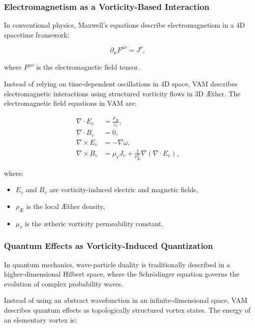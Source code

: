 \documentclass[a4paper,10pt]{article}
\begin{document}
    \subsubsection*{Electromagnetism as a Vorticity-Based Interaction}

    In conventional physics, Maxwell's equations describe electromagnetism in a 4D spacetime framework:

    \begin{equation*}
        \partial_\mu F^{\mu\nu} = J^\nu,
    \end{equation*}

    where \( F^{\mu\nu} \) is the electromagnetic field tensor.

    Instead of relying on time-dependent oscillations in 4D space, VAM describes electromagnetic interactions using structured vorticity flows in 3D Æther. The electromagnetic field equations in VAM are:

    \begin{align}
        \nabla \cdot E_v &= \frac{\rho_\text{Æ}}{\varepsilon_v}, \\
        \nabla \cdot B_v &= 0, \\
        \nabla \times E_v &= -\nabla \omega, \\
        \nabla \times B_v &= \mu_v J_v + \frac{1}{\nu^2_\text{Æ}} \nabla(\nabla \cdot E_v),
    \end{align}

    where:
    \begin{itemize}
        \item \( E_v \) and \( B_v \) are vorticity-induced electric and magnetic fields,
        \item \( \rho_\text{Æ} \) is the local Æther density,
        \item \( \mu_v \) is the ætheric vorticity permeability constant.
    \end{itemize}

    \subsubsection*{Quantum Effects as Vorticity-Induced Quantization}

    In quantum mechanics, wave-particle duality is traditionally described in a higher-dimensional Hilbert space, where the Schrödinger equation governs the evolution of complex probability waves.

    Instead of using an abstract wavefunction in an infinite-dimensional space, VAM describes quantum effects as topologically structured vortex states. The energy of an elementary vortex is:
\end{document}
